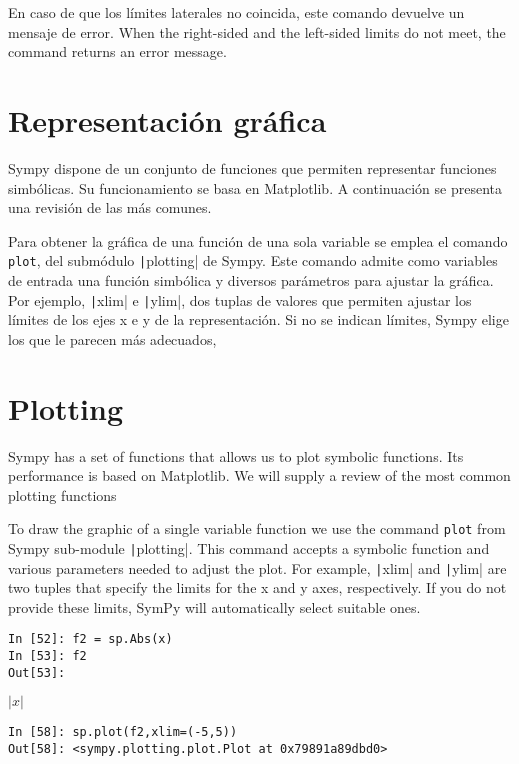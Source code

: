 \begin{paracol}{2}
En caso de que los límites laterales no coincida, este comando devuelve un mensaje de error.
\switchcolumn
When the right-sided and the left-sided limits do not meet, the command returns an error message.
\end{paracol}

\begin{paracol}{2}
\section{Representación gráfica}
Sympy dispone de un conjunto de funciones que permiten representar funciones simbólicas. Su funcionamiento se basa en Matplotlib. A continuación se presenta una revisión de las más comunes.

Para obtener la gráfica de una función de una sola variable se emplea el comando \texttt{plot}, del submódulo \texttt|plotting| de Sympy. Este comando admite como variables de entrada una función simbólica y diversos parámetros para ajustar la gráfica. Por ejemplo, \texttt|xlim| e \texttt|ylim|, dos tuplas de valores que permiten ajustar los límites de los ejes x e y de la representación. Si no se indican límites, Sympy elige los que le parecen más adecuados,
\switchcolumn
\section{Plotting}
Sympy has a set of functions that allows us to plot symbolic functions. Its performance is based on Matplotlib. We will supply a review of the most common plotting functions

To draw the graphic of a single variable function we use the command \texttt{plot} from Sympy sub-module \texttt|plotting|. This command accepts a symbolic function and various parameters needed to adjust the plot. For example, \texttt|xlim| and \texttt|ylim| are two tuples that specify the limits for the x and y axes, respectively. If you do not provide these limits, SymPy will automatically select suitable ones.
\end{paracol} 
\begin{center}
	\begin{minipage}{.6\textwidth}
		\begin{verbatim}
In [52]: f2 = sp.Abs(x)
In [53]: f2
Out[53]:
 		\end{verbatim}
		$|x|$
		\begin{verbatim}
In [58]: sp.plot(f2,xlim=(-5,5))
Out[58]: <sympy.plotting.plot.Plot at 0x79891a89dbd0>
		\end{verbatim}
	\end{minipage}
\end{center}
  
